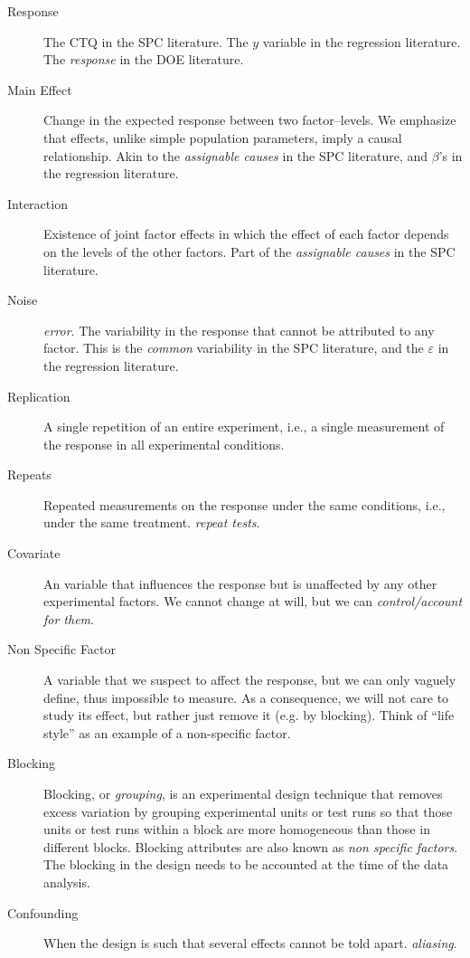 \begin{tcolorbox}[breakable]
\begin{description}
\item [Response] 
The CTQ in the SPC literature. 
The $y$ variable in the regression literature. 
The \emph{response} in the DOE literature. 

\item [Main Effect] Change in the expected response between two factor–levels.  
We emphasize that effects, unlike simple population parameters, imply a causal relationship.
Akin to the \emph{assignable causes} in the SPC literature, and $\beta$'s in the regression literature. 

\item [Interaction] Existence of joint factor effects in which the effect of each factor depends on the levels of the other factors.
Part of the \emph{assignable causes} in the SPC literature.

\item [Noise] \Aka \emph{error}. 
The variability in the response that cannot be attributed to any factor.
This is the \emph{common} variability in the SPC literature, and the $\varepsilon$ in the regression literature. 

\item [Replication] A single repetition of an entire experiment, i.e., a single measurement of the response in all experimental conditions.

\item [Repeats] Repeated measurements on the response under the same conditions, i.e., under the same treatment. \Aka \emph{repeat tests}.

\item [Covariate]  An variable that influences the response but is unaffected by any other experimental factors.
We cannot change at will, but we can \emph{control/account for them}. 

\item [Non Specific Factor] A variable that we suspect to affect the response, but we can only vaguely define, thus impossible to measure. 
As a consequence, we will not care to study its effect, but rather just remove it (e.g. by blocking). 
Think of ``life style'' as an example of a non-specific factor.

\item [Blocking]  Blocking, or \emph{grouping}, is an experimental design technique that removes excess variation by grouping experimental units or test runs so that those units or test runs within a block are more homogeneous than those in different blocks. Blocking attributes are also known as \emph{non specific factors}.
The blocking in the design needs to be accounted at the time of the data analysis.

\item [Confounding] When the design is such that several effects cannot be told apart. \Aka \emph{aliasing}.

\end{description}

\end{tcolorbox}











